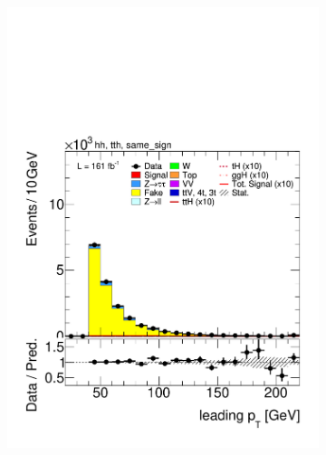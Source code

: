 \begin{figure}[htbp]
  \centering
  \begin{subfigure}[b]{0.45\textwidth}
    \centering
    \includegraphics[width=\textwidth]{images/same_sign_same_sign_run3/plot_tau_0_pt_hh_tth_22_23_24_same_sign.pdf}
    \caption{}
  \end{subfigure}
  \hfill
  \begin{subfigure}[b]{0.45\textwidth}
    \centering

\end{subfigure}
\end{figure}
